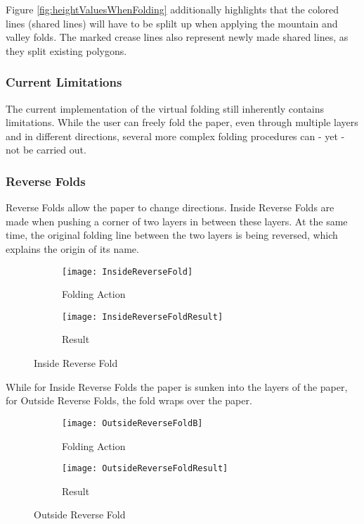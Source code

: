 \noindent Figure \ref{fig:heightValuesWhenFolding} additionally highlights that the colored lines (shared lines) will have to be splilt up when applying the mountain and valley folds. The marked crease lines also represent newly made shared lines, as they split existing polygons.


\newpage
\subsubsection{Current Limitations}
\label{sec:virtualFoldingLimits}

The current implementation of the virtual folding still inherently contains limitations. While the user can freely fold the paper, even through multiple layers and in different directions, several more complex folding procedures can - yet -  not be carried out.

\subsubsection*{Reverse Folds}
Reverse Folds allow the paper to change directions. Inside Reverse Folds are made when pushing a corner of two layers in between these layers. At the same time, the original folding line between the two layers is being reversed, which explains the origin of its name.
\begin{figure*}[htbp]
	\centering
	\begin{subfigure}{0.4\textwidth}
		\texttt{[image: InsideReverseFold]}
		\caption{Folding Action}
		\label{fig:insideReverseFoldA}
	\end{subfigure}
	\begin{subfigure}{0.4\textwidth}
		\texttt{[image: InsideReverseFoldResult]}
		\caption{Result}
		\label{fig:insideReverseFoldResult}
	\end{subfigure}
	\caption{Inside Reverse Fold}
	\label{fig:insideReverseFold}
\end{figure*}


\noindent While for Inside Reverse Folds the paper is sunken into the layers of the paper, for Outside Reverse Folds, the fold wraps over the paper.
\begin{figure*}[htbp]
	\centering
	\begin{subfigure}{0.3\textwidth}
		\texttt{[image: OutsideReverseFoldB]}
		\caption{Folding Action}
		\label{fig:outsideReverseFoldB}
	\end{subfigure}
	\begin{subfigure}{0.3\textwidth}
		\texttt{[image: OutsideReverseFoldResult]}
		\caption{Result}
		\label{fig:outsideReverseFoldResult}
	\end{subfigure}
	\caption{Outside Reverse Fold}
	\label{fig:outsideReverseFold}
\end{figure*}

